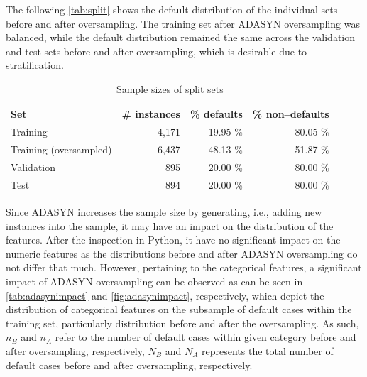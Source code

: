 The following \autoref{tab:split} shows the default distribution of the individual sets before and after oversampling. The training set after ADASYN oversampling was balanced, while the default distribution remained the same across the validation and test sets before and after oversampling, which is desirable due to stratification.
\begin{table}[H]
\small
\setlength{\tabcolsep}{8pt}
\renewcommand{\arraystretch}{1.3}
\centering
    \caption[Sample sizes of split sets]{Sample sizes of split sets}\label{tab:split}
    \begin{tabular}{lrrr}
\toprule
\textbf{Set} & \textbf{\# instances} & \textbf{\% defaults} & \textbf{\% non--defaults}\\
\midrule
\hline
Training & 4,171  & 19.95 \% & 80.05 \% \\
Training (oversampled) & 6,437 &  48.13 \% & 51.87 \% \\

Validation & 895 &  20.00 \% & 80.00 \% \\

Test & 894 &  20.00 \% & 80.00 \% \\
\hline
\bottomrule
\end{tabular}
\vspace{0.7em}

\vspace{-1em}
\end{table}

Since ADASYN increases the sample size by generating, i.e., adding new instances into the sample, it may have an impact on the distribution of the features.
After the inspection in Python, it have no significant impact on the numeric features as the distributions before and after ADASYN oversampling do not differ that much.
However, pertaining to the categorical features, a significant impact of ADASYN oversampling can be observed as can be seen in  \autoref{tab:adasynimpact} and \autoref{fig:adasynimpact}, respectively, which depict the distribution of categorical features on the subsample of default cases within the training set, particularly distribution before and after the oversampling.
As such, $n_B$ and $n_A$ refer to the number of default cases within given category before and after oversampling, respectively, $N_B$ and $N_A$ represents the total number of default cases before and after oversampling, respectively.

